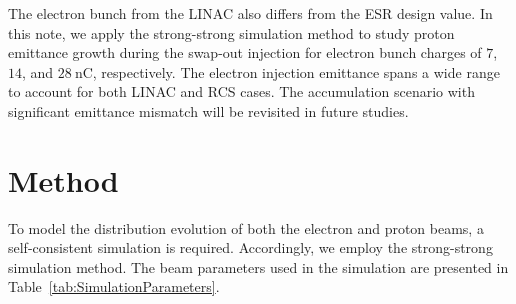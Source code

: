 \documentclass{article}
\begin{document}
The electron bunch from the LINAC also differs from the ESR design value. 
In this note, we apply the strong-strong simulation method to study proton 
emittance growth during the swap-out injection for electron bunch charges of $7$, 
$14$, and $28~\mathrm{nC}$, respectively. The electron injection emittance spans 
a wide range to account for both LINAC and RCS cases. The accumulation scenario 
with significant emittance mismatch will be revisited in future studies.
\section{Method}
To model the distribution evolution of both the electron and proton beams, 
a self-consistent simulation is required. Accordingly, we employ 
the strong-strong simulation method. The beam parameters used in the simulation 
are presented in Table~\ref{tab:SimulationParameters}. 
\end{document}
